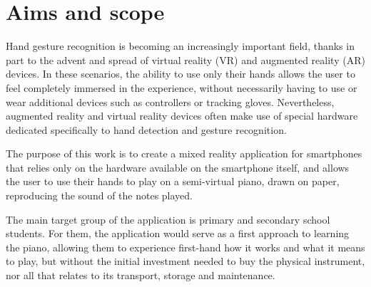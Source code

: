 \section{Aims and scope}\label{sec:aims-and-scope}
Hand gesture recognition is becoming an increasingly important field, thanks in part to the advent
and spread of virtual reality (VR) and augmented reality (AR) devices.
In these scenarios, the ability to use only their hands
allows the user to feel completely immersed in the experience,
without necessarily having to use or wear additional devices such as controllers or tracking gloves.
Nevertheless, augmented reality and virtual reality devices often make use of special hardware
dedicated specifically to hand detection and gesture recognition.

The purpose of this work is to create a mixed reality application for smartphones that relies only on the
hardware available on the smartphone itself, and allows the user to use their hands to play on a semi-virtual piano,
drawn on paper, reproducing the sound of the notes played.

The main target group of the application is primary and secondary school students.
For them, the application would serve as a first approach to learning the piano,
allowing them to experience first-hand how it works and what it means to play, but without the initial
investment needed to buy the physical instrument, nor all that relates to its transport, storage and maintenance.
